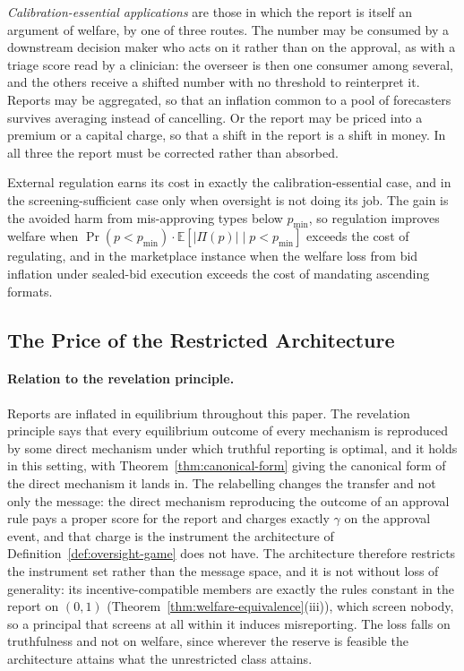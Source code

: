 \documentclass[acmsmall,nonacm,screen]{acmart}
\theoremstyle{acmplain}%
\theoremstyle{acmdefinition}%
\newcommand{\E}{\mathbb{E}}
\numberwithin{equation}{section}
\begin{document}
\emph{Calibration-essential applications} are those in which the report is itself an argument of welfare, by one of three routes. The number may be consumed by a downstream decision maker who acts on it rather than on the approval, as with a triage score read by a clinician: the overseer is then one consumer among several, and the others receive a shifted number with no threshold to reinterpret it. Reports may be aggregated, so that an inflation common to a pool of forecasters survives averaging instead of cancelling. Or the report may be priced into a premium or a capital charge, so that a shift in the report is a shift in money. In all three the report must be corrected rather than absorbed.

External regulation earns its cost in exactly the calibration-essential case, and in the screening-sufficient case only when oversight is not doing its job. The gain is the avoided harm from mis-approving types below $p_{\min}$, so regulation improves welfare when $\Pr(p < p_{\min}) \cdot \E[|\Pi(p)| \mid p < p_{\min}]$ exceeds the cost of regulating, and in the marketplace instance when the welfare loss from bid inflation under sealed-bid execution exceeds the cost of mandating ascending formats.

\subsection{The Price of the Restricted Architecture}

\paragraph{Relation to the revelation principle.}
Reports are inflated in equilibrium throughout this paper. The revelation principle says that every equilibrium outcome of every mechanism is reproduced by some direct mechanism under which truthful reporting is optimal, and it holds in this setting, with Theorem~\ref{thm:canonical-form} giving the canonical form of the direct mechanism it lands in. The relabelling changes the transfer and not only the message: the direct mechanism reproducing the outcome of an approval rule pays a proper score for the report and charges exactly $\gamma$ on the approval event, and that charge is the instrument the architecture of Definition~\ref{def:oversight-game} does not have. The architecture therefore restricts the instrument set rather than the message space, and it is not without loss of generality: its incentive-compatible members are exactly the rules constant in the report on $(0,1)$ (Theorem~\ref{thm:welfare-equivalence}(iii)), which screen nobody, so a principal that screens at all within it induces misreporting. The loss falls on truthfulness and not on welfare, since wherever the reserve is feasible the architecture attains what the unrestricted class attains.
\end{document}
